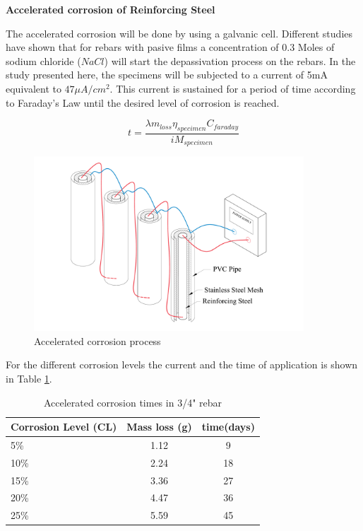 \textbf{Accelerated corrosion  of Reinforcing Steel}

The accelerated corrosion will be done by using a galvanic cell. Different studies \cite{Ghods2010} have shown that for rebars with pasive films a concentration of 0.3 Moles of sodium chloride ($NaCl$) will start the depassivation process on the rebars. In the study presented here, the specimens will be subjected to a current of 5mA equivalent to $47\mu A/cm^2$. This current is sustained for a period of time according to Faraday's Law until the desired level of corrosion is reached.

\begin{equation}
	t=\frac{\lambda m_{loss} \eta_{specimen} C_{faraday}}{i M_{specimen}}
	\label{eq.FaradayEq}
\end{equation}

\begin{figure}[htbp]
	\centering
	\includegraphics[width=0.9\textwidth]{Chapter-4/figs/AcceleratedCorrosionProcedure}
	\caption{Accelerated corrosion process}
	\label{fig:AcceleratedCorrosion}
\end{figure}

For the different corrosion levels the current and the time of application is shown in Table \ref{tab:AcceleratedCorrosionTime}. 

\begin{table}[htbp]
	\caption{Accelerated corrosion times in 3/4" rebar}
	\label{tab:AcceleratedCorrosionTime}
	\centering	
		\begin{tabular}{|l|c|c|}
		\hline
		Corrosion Level (CL) & Mass loss (g)   & time(days)     \\  \hline	
		5\%                  & 1.12            & 9  \\  \hline	
		10\%                 & 2.24            & 18 \\  \hline	
		15\%                 & 3.36            & 27 \\  \hline	
		20\%                 & 4.47            & 36 \\  \hline	
		25\%                 & 5.59            & 45 \\  \hline	
		\end{tabular}
\end{table}


